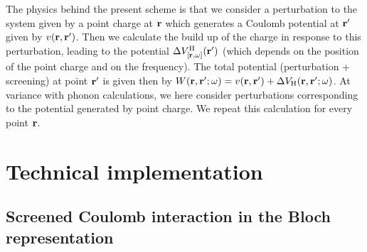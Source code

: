 \documentclass[twocolumn,prb,showpacs,superscriptaddress]{revtex4}
\def\w{\omega}
\def\r{{\bf r}}
\def\rp{{\bf r^\prime}}
\begin{document}
The physics behind the present scheme is that we consider a perturbation to
the system given by a point charge at $\r$ which generates a Coulomb potential
at $\rp$ given by $v(\r,\rp)$. Then we calculate the build up of the charge
in response to this perturbation, leading to the potential $\Delta V^{\rm H}_{[\r,\w]}(\rp)$
(which depends on the position of the point charge and on the frequency).
The total potential (perturbation + screening) at point $\rp$ is given then
by $W(\r,\rp;\w) = v(\r,\rp) + \Delta V_{\rm H}(\r,\rp;\w)$.
At variance with phonon calculations, we here consider perturbations corresponding
to the potential generated by point charge. We repeat this calculation for
every point $\r$.

\section{Technical implementation}

\subsection{Screened Coulomb interaction in the Bloch representation}
\end{document}
